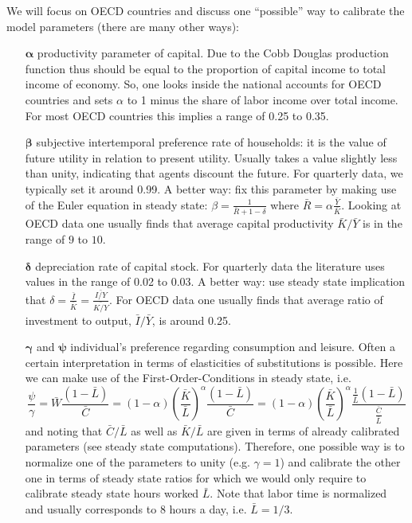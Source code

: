 \documentclass[a4paper]{scrartcl}
\begin{document}
\begin{enumerate}
\begin{solution}
		We will focus on OECD countries and discuss one \enquote{possible} way to calibrate the model parameters (there are many other ways):
		\begin{itemize}
			\item[$\boldsymbol{\alpha}$] productivity parameter of capital. Due to the Cobb Douglas production function thus should be equal to the proportion of capital income to total income of economy. So, one looks inside the national accounts for OECD countries and sets $\alpha$ to 1 minus the share of labor income over total income. For most OECD countries this implies a range of 0.25 to 0.35.
			\item[$\boldsymbol{\beta}$] subjective intertemporal preference rate of households: it is the value of future utility in relation to present utility. Usually takes a value slightly less than unity, indicating that agents discount the future. For quarterly data, we typically set it around 0.99. A better way: fix this parameter by making use of the Euler equation in steady state: $\beta = \frac{1}{\bar{R}+1-\delta}$ where $\bar{R}=\alpha \frac{\bar{Y}}{\bar{K}}$. Looking at OECD data one usually finds that average capital productivity $\bar{K}/\bar{Y}$ is in the range of $9$ to $10$.
			\item[$\boldsymbol{\delta}$] depreciation rate of capital stock. For quarterly data the literature uses values in the range of 0.02 to 0.03. A better way: use steady state implication that $\delta=\frac{\bar{I}}{\bar{K}}=\frac{\bar{I/Y}}{\bar{K/Y}}$. For OECD data one usually finds that average ratio of investment to output, $\bar{I}/\bar{Y}$, is around 0.25.
			\item[$\boldsymbol{\gamma}$ and $\boldsymbol{\psi}$] individual's preference regarding consumption and leisure. Often a certain interpretation in terms of elasticities of substitutions is possible. Here we can make use of the First-Order-Conditions in steady state, i.e.
			$$\frac{\psi}{\gamma} = \bar{W}\frac{(1-\bar{L})}{\bar{C}}= (1-\alpha)\left(\frac{\bar{K}}{\bar{L}}\right)^\alpha\frac{(1-\bar{L})}{\bar{C}} = (1-\alpha)\left(\frac{\bar{K}}{\bar{L}}\right)^\alpha\frac{\frac{1}{\bar{L}}(1-\bar{L})}{\frac{\bar{C}}{\bar{L}}}$$
			and noting that $\bar{C}/\bar{L}$ as well as $\bar{K}/\bar{L}$ are given in terms of already calibrated parameters (see steady state computations). Therefore, one possible way is to normalize one of the parameters to unity (e.g. $\gamma=1$) and calibrate the other one in terms of steady state ratios for which we would only require to calibrate steady state hours worked $\bar{L}$. Note that labor time is normalized and usually corresponds to 8 hours a day, i.e. $\bar{L}=1/3$.

\end{itemize}
\end{solution}
\end{enumerate}
\end{document}
